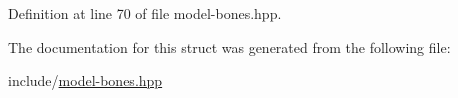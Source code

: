 Definition at line 70 of file model-\/bones.\+hpp.



The documentation for this struct was generated from the following file\+:\begin{DoxyCompactItemize}
\item 
include/\hyperlink{model-bones_8hpp}{model-\/bones.\+hpp}\end{DoxyCompactItemize}
